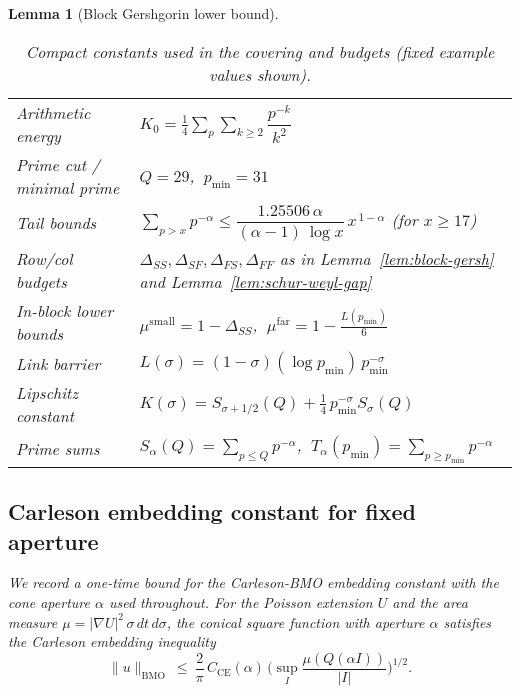 \documentclass[11pt]{article}
\newtheorem{lemma}{Lemma}[section]
\theoremstyle{definition}
\theoremstyle{remark}
\begin{document}
\begin{lemma}[Block Gershgorin lower bound]
\begin{table}[H]
\centering
\caption{Compact constants used in the covering and budgets (fixed example values shown).}
\begin{tabular}{l l}
\toprule
Arithmetic energy & $K_0=\tfrac14\sum_{p}\sum_{k\ge2} \dfrac{p^{-k}}{k^2}$ \\ 
Prime cut / minimal prime & $Q=29$, $\ p_{\min}=31$ \\ 
Tail bounds & $\sum_{p>x}p^{-\alpha} \le \dfrac{1.25506\,\alpha}{(\alpha-1)\,\log x}\,x^{\,1-\alpha}$ (for $x\ge 17$) \\ 
Row/col budgets & $\Delta_{SS},\Delta_{SF},\Delta_{FS},\Delta_{FF}$ as in Lemma~\ref{lem:block-gersh} and Lemma~\ref{lem:schur-weyl-gap} \\ 
In-block lower bounds & $\mu^{\mathrm{small}}=1-\Delta_{SS}$, $\ \mu^{\mathrm{far}}=1-\tfrac{L(p_{\min})}{6}$ \\ 
Link barrier & $L(\sigma)=(1-\sigma)(\log p_{\min})\,p_{\min}^{-\sigma}$ \\ 
Lipschitz constant & $K(\sigma)=S_{\sigma+1/2}(Q)+\tfrac14\,p_{\min}^{-\sigma}S_{\sigma}(Q)$ \\ 
Prime sums & $S_{\alpha}(Q)=\sum_{p\le Q} p^{-\alpha}$, $\ T_{\alpha}(p_{\min})=\sum_{p\ge p_{\min}} p^{-\alpha}$ \\ 
\bottomrule
\end{tabular}
\end{table}









\subsection{Carleson embedding constant for fixed aperture}
\label{app:CE-constant}
We record a one-time bound for the Carleson-BMO embedding constant with the cone aperture $\alpha$ used throughout. For the Poisson extension $U$ and the area measure $\mu=|\nabla U|^2\,\sigma\,dt\,d\sigma$, the conical square function with aperture $\alpha$ satisfies the Carleson embedding inequality
\[
  \|u\|_{\mathrm{BMO}}\ \le\ \frac{2}{\pi}\,C_{\mathrm{CE}}(\alpha)\,\Big(\sup_I \frac{\mu(Q(\alpha I))}{|I|}\Big)^{\!1/2}.
\]






\end{lemma}
\end{document}
